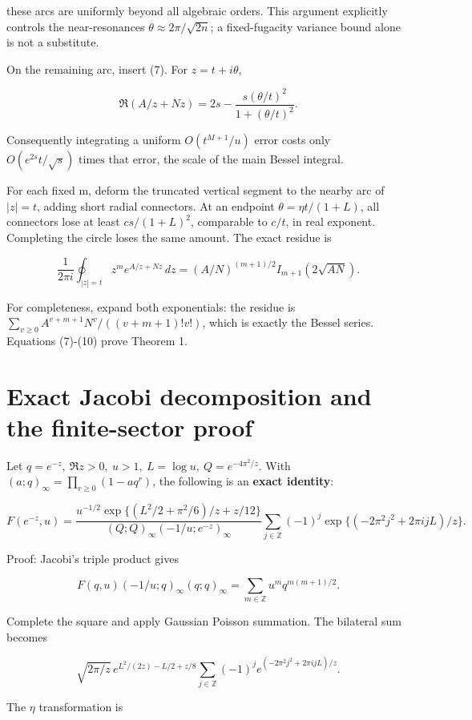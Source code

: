 \documentclass[11pt,letterpaper]{article}
\begin{document}
these arcs are uniformly beyond all algebraic orders. This argument
explicitly controls the near-resonances \(\theta\approx2\pi/\sqrt{2n}\);
a fixed-fugacity variance bound alone is not a substitute.

On the remaining arc, insert (7). For \(z=t+i\theta\),

\[
 \Re(A/z+Nz)=2s-\frac{s(\theta/t)^2}{1+(\theta/t)^2}.
\]

Consequently integrating a uniform \(O(t^{M+1}/u)\) error costs only
\(O(e^{2s}t/\sqrt s)\text{ times that error}\), the scale of the main
Bessel integral.

For each fixed m, deform the truncated vertical segment to the nearby
arc of \(|z|=t\), adding short radial connectors. At an endpoint
\(\theta=\eta t/(1+L)\), all connectors lose at least \(cs/(1+L)^2\),
comparable to \(c/t\), in real exponent. Completing the circle loses the
same amount. The exact residue is

\[
 \frac1{2\pi i}\oint_{|z|=t}z^m e^{A/z+Nz}\,dz
 =(A/N)^{(m+1)/2}I_{m+1}(2\sqrt{AN}). \tag{10}
\]

For completeness, expand both exponentials: the residue is
\(\sum_{v\ge0}A^{v+m+1}N^v/((v+m+1)!v!)\), which is exactly the Bessel
series. Equations (7)-(10) prove Theorem 1.

\section{Exact Jacobi decomposition and the finite-sector
proof}\label{mfp:exact-jacobi-decomposition-and-the-finite-sector-proof}

Let \(q=e^{-z},\ \Re z>0,\ u>1,\ L=\log u,\ Q=e^{-4\pi^2/z}\). With
\((a;q)_\infty=\prod_{r\ge0}(1-aq^r)\), the following is an
\textbf{exact identity}:

\[
 F(e^{-z},u)=\frac{u^{-1/2}\exp\{(L^2/2+\pi^2/6)/z+z/12\}}
 {(Q;Q)_\infty(-1/u;e^{-z})_\infty}
 \sum_{j\in\mathbb Z}(-1)^j
 \exp\{(-2\pi^2j^2+2\pi i jL)/z\}. \tag{11}
\]

Proof: Jacobi's triple product gives

\[
 F(q,u)(-1/u;q)_\infty(q;q)_\infty
 =\sum_{m\in\mathbb Z}u^m q^{m(m+1)/2}.
\]

Complete the square and apply Gaussian Poisson summation. The bilateral
sum becomes

\[
 \sqrt{2\pi/z}\,e^{L^2/(2z)-L/2+z/8}
 \sum_{j\in\mathbb Z}(-1)^j e^{(-2\pi^2j^2+2\pi ijL)/z}.
\]

The \(\eta\) transformation is
\end{document}
